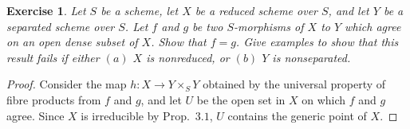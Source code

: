 \documentclass[12pt,letterpaper]{article}
\newtheorem{problem}{Exercise}[section]
\theoremstyle{definition}
\theoremstyle{remark}
\numberwithin{equation}{section}
\numberwithin{figure}{problem}
\begin{document}
\begin{problem}
  Let $S$ be a scheme, let $X$ be a reduced scheme over $S$, and let $Y$ be a
  separated scheme over $S$. Let $f$ and $g$ be two $S$-morphisms of $X$ to $Y$
  which agree on an open dense subset of $X$. Show that $f = g$. Give examples
  to show that this result fails if either $(a)$ $X$ is nonreduced, or $(b)$ $Y$
  is nonseparated.
\end{problem}
\begin{proof}
  Consider the map $h \colon X \to Y \times_S Y$ obtained by the universal
  property of fibre products from $f$ and $g$, and let $U$ be the open set in
  $X$ on which $f$ and $g$ agree. Since $X$ is irreducible by Prop.\ $3.1$, $U$
  contains the generic point of $X$.
\end{proof}

\printbibliography
\end{document}
